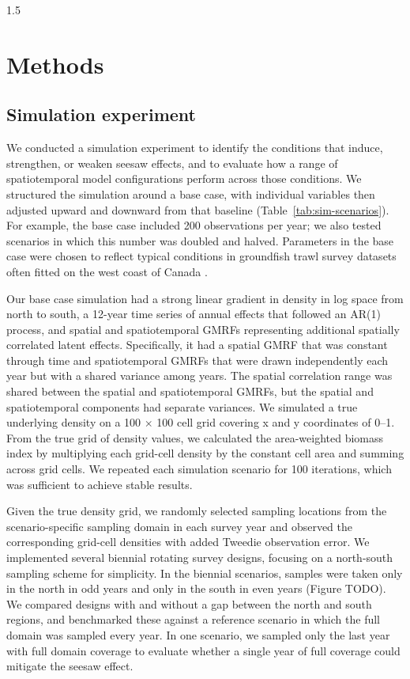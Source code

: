 \documentclass[11pt]{article}
\begin{document}
\begin{spacing}{1.5}
\section*{Methods}

\subsection*{Simulation experiment}

We conducted a simulation experiment to identify the conditions that induce, strengthen, or weaken seesaw effects, and to evaluate how a range of spatiotemporal model configurations perform across those conditions.
We structured the simulation around a base case, with individual variables then adjusted upward and downward from that baseline (Table~\ref{tab:sim-scenarios}). 
For example, the base case included 200 observations per year; we also tested scenarios in which this number was doubled and halved. 
Parameters in the base case were chosen to reflect typical conditions in groundfish trawl survey datasets often fitted on the west coast of Canada \citep[e.g.,][]{andersonReproducibleData2019}.

Our base case simulation had a strong linear gradient in density in log space from north to south, a 12-year time series of annual effects that followed an AR(1) process, and spatial and spatiotemporal GMRFs representing additional spatially correlated latent effects.
Specifically, it had a spatial GMRF that was constant through time and spatiotemporal GMRFs that were drawn independently each year but with a shared variance among years. 
The spatial correlation range was shared between the spatial and spatiotemporal GMRFs, but the spatial and spatiotemporal components had separate variances.
We simulated a true underlying density on a 100 $\times$ 100 cell grid covering x and y coordinates of 0--1.
From the true grid of density values, we calculated the area-weighted biomass index by multiplying each grid-cell density by the constant cell area and summing across grid cells.
We repeated each simulation scenario for 100 iterations, which was sufficient to achieve stable results.

Given the true density grid, we randomly selected sampling locations from the scenario-specific sampling domain in each survey year and observed the corresponding grid-cell densities with added Tweedie observation error.
We implemented several biennial rotating survey designs, focusing on a north-south sampling scheme for simplicity.
In the biennial scenarios, samples were taken only in the north in odd years and only in the south in even years (Figure TODO). 
We compared designs with and without a gap between the north and south regions, and benchmarked these against a reference scenario in which the full domain was sampled every year. 
In one scenario, we sampled only the last year with full domain coverage to evaluate whether a single year of full coverage could mitigate the seesaw effect.


\end{spacing}
\end{document}
